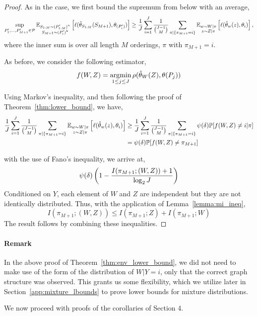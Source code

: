 \begin{proof}
As in the \iid case, we first bound the supremum from below with an average,
\[\sup_{P'_1,\ldots,P'_{M+1} \in \mathcal{P}} \mathbb{E}_{\substack{S_{1:M}\sim (P'_{1:M})^n\\S_{M+1} \sim (P'_i)^k}}\left[ \ell(\hat{\theta}_{S_{1:M}}(S_{M+1}), \theta_{(P'_i)}) \right]
\geq 
\frac{1}{J}\sum^{J}_{i=1} \frac{1}{{J-1 \choose M}}\sum_{\pi|\{\pi_{M+1} = i\}}
\mathbb{E}_{\substack{w\sim W|\pi\\z \sim Z|\pi}}\left[ \ell(\hat{\theta}_{w}(z), \theta_{i}) \right],
\]
where the inner sum is over all length $M$ orderings, $\pi$ with $\pi_{M+1} = i$.

As before, we consider the following estimator,
\[f(W,Z) = \mathop{\textrm{argmin}}_{1\leq j\leq J} \rho(\hat{\theta}_{W}(Z), \theta(P_j))\]

Using Markov's inequality, and then following the proof of Theorem~\ref{thm:lower_bound}, we have,
\begin{align*}
    \frac{1}{J}\sum^{J}_{i=1} \frac{1}{{J-1 \choose M}}\sum_{\pi|\{\pi_{M+1} = i\}}
\mathbb{E}_{\substack{w\sim W|\pi\\z \sim Z|\pi}}\left[ \ell(\hat{\theta}_{w}(z), \theta_{i}) \right]
&\geq\frac{1}{J}\sum^{J}_{i=1} \frac{1}{{J-1 \choose M}}\sum_{\pi|\{\pi_{M+1} = i\}}\psi(\delta)\mathbb{P}[f(W,Z) \neq i\vert \pi] \\
    &= \psi(\delta)\mathbb{P}[f(W,Z) \neq \pi_{M+1}]
\end{align*}

with the use of Fano's inequality, we arrive at,
\begin{align*}
\psi(\delta)\left(1 - \dfrac{I(\pi_{M+1}; (W,Z)) + 1}{\log_2 J}\right)
\end{align*}
Conditioned on $Y$, each element of $W$ and $Z$ are independent but they are not identically distributed. Thus, with the application of Lemma~\ref{lemma:mi_ineq},
\[ I(\pi_{M+1}; (W,Z)) \leq I(\pi_{M+1};Z) + I(\pi_{M+1};W)\]
The result follows by combining these inequalities.
\end{proof}

\paragraph{Remark}
In the above proof of Theorem~\ref{thm:env_lower_bound}, we did not need to make use of the form of the distribution of $W|{Y=i}$, only that the correct graph structure was observed. This grants us some flexibility, which we utilize later in Section~\ref{app:mixture_lbounds} to prove lower bounds for mixture distributions.

We now proceed with proofs of the corollaries of Section 4.

